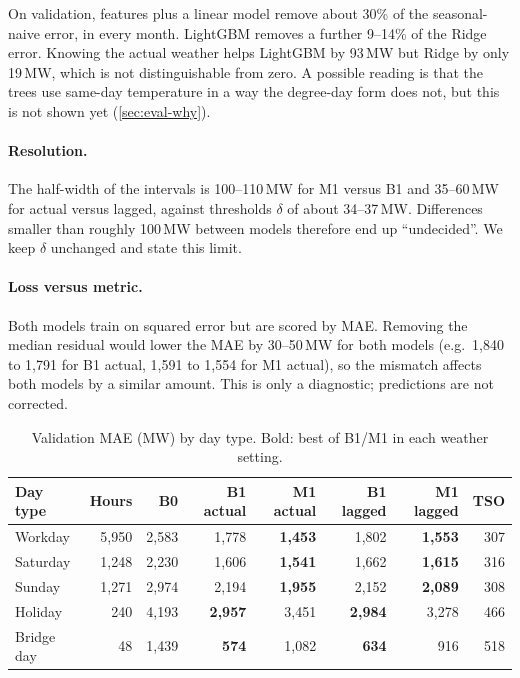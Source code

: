 On validation, features plus a linear model remove about 30\% of the seasonal-naive error, in every
month. LightGBM removes a further 9--14\% of the Ridge error. Knowing the actual weather helps
LightGBM by 93\,MW but Ridge by only 19\,MW, which is not distinguishable from zero. A possible
reading is that the trees use same-day temperature in a way the degree-day form does not, but this
is not shown yet (\cref{sec:eval-why}).

\paragraph{Resolution.} The half-width of the intervals is 100--110\,MW for M1 versus B1 and
35--60\,MW for actual versus lagged, against thresholds $\delta$ of about 34--37\,MW. Differences
smaller than roughly 100\,MW between models therefore end up ``undecided''. We keep $\delta$
unchanged and state this limit.

\paragraph{Loss versus metric.} Both models train on squared error but are scored by MAE. Removing
the median residual would lower the MAE by 30--50\,MW for both models (e.g.\ 1{,}840 to 1{,}791 for
B1 actual, 1{,}591 to 1{,}554 for M1 actual), so the mismatch affects both models by a similar
amount. This is only a diagnostic; predictions are not corrected.

\begin{table}[H]
  \centering
  \small
  \caption{Validation MAE (MW) by day type. Bold: best of B1/M1 in each weather setting.}
  \label{tab:val-daytype}
  \begin{tabular}{@{}l r r r r r r r@{}}
    \toprule
    Day type & Hours & B0 & B1 actual & M1 actual & B1 lagged & M1 lagged & TSO \\
    \midrule
    Workday & 5{,}950 & 2{,}583 & 1{,}778 & \textbf{1{,}453} & 1{,}802 & \textbf{1{,}553} & 307 \\
    Saturday & 1{,}248 & 2{,}230 & 1{,}606 & \textbf{1{,}541} & 1{,}662 & \textbf{1{,}615} & 316 \\
    Sunday & 1{,}271 & 2{,}974 & 2{,}194 & \textbf{1{,}955} & 2{,}152 & \textbf{2{,}089} & 308 \\
    Holiday & 240 & 4{,}193 & \textbf{2{,}957} & 3{,}451 & \textbf{2{,}984} & 3{,}278 & 466 \\
    Bridge day & 48 & 1{,}439 & \textbf{574} & 1{,}082 & \textbf{634} & 916 & 518 \\
    \bottomrule
  \end{tabular}
\end{table}

